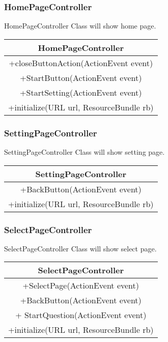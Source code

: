 \subsubsection{HomePageController}
HomePageController Class will show home page.
\begin{center}\begin{tabular}{ |c| } \hline HomePageController \\ \hline +closeButtonAction(ActionEvent event) \\ +StartButton(ActionEvent event) \\ +StartSetting(ActionEvent event) \\ +initialize(URL url, ResourceBundle rb) \\ \hline \end{tabular}\end{center}

\subsubsection{SettingPageController}
SettingPageController Class will show setting page.
\begin{center}\begin{tabular}{ |c| } \hline SettingPageController \\ \hline  +BackButton(ActionEvent event)\\ +initialize(URL url, ResourceBundle rb) \\ \hline \end{tabular}\end{center}

\subsubsection{SelectPageController}
SelectPageController Class will show select page.
\begin{center}\begin{tabular}{ |c| } \hline SelectPageController \\ \hline +SelectPage(ActionEvent event) \\  +BackButton(ActionEvent event) \\ + StartQuestion(ActionEvent event) \\ +initialize(URL url, ResourceBundle rb) \\ \hline \end{tabular}\end{center}

